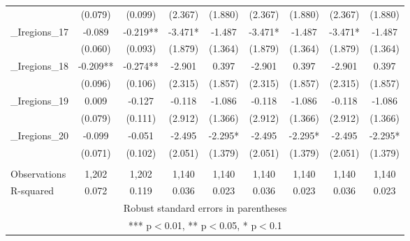\documentclass[]{article}
\begin{document}
\begin{tabular}{lcccccccc}
 & (0.079) & (0.099) & (2.367) & (1.880) & (2.367) & (1.880) & (2.367) & (1.880) \\
\_Iregions\_17 & -0.089 & -0.219** & -3.471* & -1.487 & -3.471* & -1.487 & -3.471* & -1.487 \\
 & (0.060) & (0.093) & (1.879) & (1.364) & (1.879) & (1.364) & (1.879) & (1.364) \\
\_Iregions\_18 & -0.209** & -0.274** & -2.901 & 0.397 & -2.901 & 0.397 & -2.901 & 0.397 \\
 & (0.096) & (0.106) & (2.315) & (1.857) & (2.315) & (1.857) & (2.315) & (1.857) \\
\_Iregions\_19 & 0.009 & -0.127 & -0.118 & -1.086 & -0.118 & -1.086 & -0.118 & -1.086 \\
 & (0.079) & (0.111) & (2.912) & (1.366) & (2.912) & (1.366) & (2.912) & (1.366) \\
\_Iregions\_20 & -0.099 & -0.051 & -2.495 & -2.295* & -2.495 & -2.295* & -2.495 & -2.295* \\
 & (0.071) & (0.102) & (2.051) & (1.379) & (2.051) & (1.379) & (2.051) & (1.379) \\
 &  &  &  &  &  &  &  &  \\
Observations & 1,202 & 1,202 & 1,140 & 1,140 & 1,140 & 1,140 & 1,140 & 1,140 \\
 R-squared & 0.072 & 0.119 & 0.036 & 0.023 & 0.036 & 0.023 & 0.036 & 0.023 \\ \hline
\multicolumn{9}{c}{ Robust standard errors in parentheses} \\
\multicolumn{9}{c}{ *** p$<$0.01, ** p$<$0.05, * p$<$0.1} \\
\end{tabular}
\end{document}
